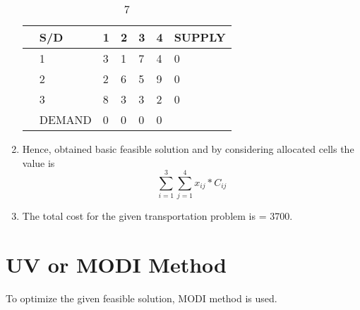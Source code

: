 \documentclass[journal,12pt,twocolumn]{IEEEtran}
\begin{document}
\begin{enumerate}[1.]
\begin{table}[!h]
\begin{center}
\begin{tabular}{l  l | l l l l | l  }
                 & S/D & 1 & 2 & 3 & 4 &  SUPPLY  \\
\hline
& 1 & 3 & 1 & 7 & 4 & 0 \\ 
& 2 & 2 & 6 & 5 & 9 & 0  \\ 
& 3 & 8 & 3 & 3 & 2 & 0 \\ 
\hline
&DEMAND& 0&0&0&0\\ 
\end{tabular}
\end{center}
\caption{7}
\label{table7}
\end{table}
\item
Hence, obtained basic feasible solution and by considering allocated cells
the value is 
\begin{equation}
\sum_{i=1}^{3}\sum_{j=1}^{4} x_{ij}*C_{ij}
\end{equation}
\label{eq:total}
\item The total cost for the given transportation problem is = 3700.


\end{enumerate}

\section{UV or MODI Method}

To optimize the given feasible solution, MODI method is used.
\end{document}
